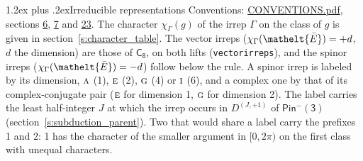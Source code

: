 \documentclass[10pt,a4paper]{article}
\makeatletter
\renewcommand\section{\@startsection{section}{1}{\z@}{-3ex plus -1ex minus -.2ex}%
  {1.2ex plus .2ex}{\normalfont\large\sffamily\bfseries\color{parttitle}}}
\numberwithin{equation}{section}
\newcommand{\eltfont}[1]{{\let\sigma\eltsigma\mathelt{#1}}}
\newcommand{\grp}[1]{\mathsf{#1}}
\newcommand{\irr}[1]{\text{\normalfont\scshape #1}}
\newcommand{\elt}[1]{\eltfont{#1}}
\newcommand{\irrJp}[2]{D^{(#1,#2)}}
\newcommand{\irchar}[1]{\chi_{#1}}
\newcommand{\barred}[1]{\bar{#1}}
\makeatother
\begin{document}
\section{Irreducible representations}\label{s:irreps}
Conventions: \href{../../CONVENTIONS.pdf}{CONVENTIONS.pdf}, sections \href{../../../rotation/CONVENTIONS.pdf\#conv.6}{6}, \href{../../../rotation/CONVENTIONS.pdf\#conv.7}{7} and \href{../../CONVENTIONS.pdf\#conv.23}{23}.
\leavevmode\label{n:function.character}\label{n:irrep.Gamma}The character $\irchar{\Gamma}(g)$ of the irrep $\Gamma$ on the class of $g$ is given in section~\ref{s:character_table}. \label{n:index.dimension}The vector irreps ($\irchar{\Gamma}(\elt{\barred{E}}) = +d$, $d$ the dimension) are those of \href{../../../rotation/data/pdf/C8.pdf}{$\grp{C_{8}}$}, on both lifts (\texttt{vectorirreps}), and the spinor irreps ($\irchar{\Gamma}(\elt{\barred{E}}) = -d$) follow below the rule. A spinor irrep is labeled by its dimension, $\irr{a}$ (1), $\irr{e}$ (2), $\irr{g}$ (4) or $\irr{i}$ (6), and a complex one by that of its complex-conjugate pair ($\irr{e}$ for dimension 1, $\irr{g}$ for dimension 2). The label carries the least half-integer $J$ at which the irrep occurs in $\irrJp{J}{+1}$ of $\grp{Pin^{-}(3)}$ (section~\ref{s:subduction_parent}). Two that would share a label carry the prefixes 1 and 2: 1 has the character of the smaller argument in $[0, 2\pi)$ on the first class with unequal characters.
\end{document}

